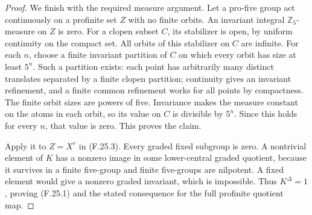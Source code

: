 \begin{proof}
We finish with the required measure argument.
Let a pro-five group act continuously on a
profinite set $Z$ with no finite orbits.
An invariant integral $\mathbb Z_5$-measure
on $Z$ is zero.
For a clopen subset $C$, its stabilizer is open,
by uniform continuity on the compact set.
All orbits of this stabilizer on $C$ are
infinite.  For each $n$, choose a finite
invariant partition of $C$ on which every
orbit has size at least $5^n$.
Such a partition exists: each point has
arbitrarily many distinct translates separated
by a finite clopen partition; continuity gives
an invariant refinement, and a finite common
refinement works for all points by compactness.
The finite orbit sizes are powers of five.
Invariance makes the measure constant on the
atoms in each orbit, so its value on $C$ is
divisible by $5^n$.  Since this holds for every
$n$, that value is zero.  This proves the claim.

Apply it to $Z=X^r$ in (F.25.3).
Every graded fixed subgroup is zero.
A nontrivial element of $K$ has a nonzero image
in some lower-central graded quotient, because
it survives in a finite five-group and finite
five-groups are nilpotent.  A fixed element
would give a nonzero graded invariant, which
is impossible.  Thus $K^\Delta=1$, proving
(F.25.1) and the stated consequence for the
full profinite quotient map.
\end{proof}

